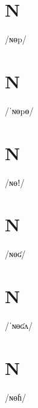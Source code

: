 \documentclass[10pt,a4paper,twoside]{book}
\begin{document}
\section*{N}

\begin{multicols}{3}
 {/ɴɵp/} {}
\end{multicols}

\section*{N}

\begin{multicols}{3}
 {/ˈɴɵpɵ/} {}
\end{multicols}

\section*{N}

\begin{multicols}{3}
 {/ɴɵǃ/} {}
\end{multicols}

\section*{N}

\begin{multicols}{3}
 {/ɴɵʛ/} {}
\end{multicols}

\section*{N}

\begin{multicols}{3}
 {/ˈɴɵʛʌ/} {}
\end{multicols}

\section*{N}

\begin{multicols}{3}
 {/ɴɵɦ/} {}
\end{multicols}
\end{document}
